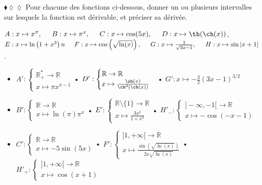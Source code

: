 \documentclass[11pt]{article}
\begin{document}
\begin{exercice}{$\blacklozenge\lozenge\lozenge$}{}
    Pour chacune des fonctions ci-dessous, donner un ou plusieurs intervalles sur lesquels la fonction est dérivable, et préciser sa dérivée.
    \begin{center}
        $A:x\mapsto x^\pi,\hspace{0.5cm}B:x\mapsto\pi^x,\hspace{0.5cm}C:x\mapsto\cos(5x),\hspace{0.5cm}D:x\mapsto\th(\ch(x))$,\\
        $E:x\mapsto\ln\left(1+x^3\right)n\hspace{0.5cm}F:x\mapsto\cos\left(\sqrt{\ln(x)}\right),\hspace{0.5cm}G:x\mapsto\frac{1}{\sqrt{3x-1}},\hspace{0.5cm}H:x\mapsto\sin|x+1|$.
    \end{center}
    \tcblower
    \null
    \begin{itemize}
        \item $A':\begin{cases}\mathbb{R}^*_+\rightarrow\mathbb{R}\\x\mapsto\pi x^{\pi-1}\end{cases}$\hspace{1.8cm}• $D':\begin{cases}\mathbb{R}\rightarrow\mathbb{R}\\x\mapsto\frac{\sh(x)}{\ch^2(\ch(x))}\end{cases}$\hspace{1.6cm}• $G':x\mapsto-\frac{3}{2}(3x-1)^{3/2}$
        \item $B':\begin{cases}\mathbb{R}\rightarrow\mathbb{R}\\x\mapsto\ln(\pi)\pi^x\end{cases}$\hspace{1.5cm}• $E':\begin{cases}\mathbb{R}\setminus\{1\}\rightarrow\mathbb{R}\\x\mapsto\frac{3x^2}{1+x^3}\end{cases}$\hspace{1.6cm}• $H'_-:\begin{cases}]-\infty,-1[\rightarrow\mathbb{R}\\x\mapsto-\cos(-x-1)\end{cases}$
        \item $C':\begin{cases}\mathbb{R}\rightarrow\mathbb{R}\\x\mapsto-5\sin(5x)\end{cases}$\hspace{1.0cm}• $F':\begin{cases}]1,+\infty[\rightarrow\mathbb{R}\\x\mapsto\frac{\sin(\sqrt{\ln(x)})}{2x\sqrt{\ln(x)}}\end{cases}$\hspace{1.6cm}• $H'_+:\begin{cases}]1,+\infty[\rightarrow\mathbb{R}\\x\mapsto\cos(x+1)\end{cases}$

\end{itemize}
\end{exercice}
\end{document}
